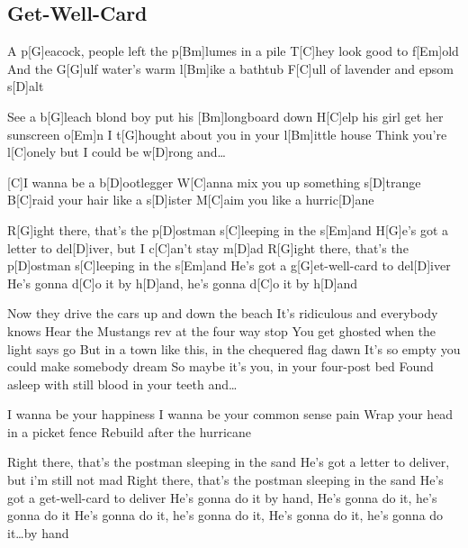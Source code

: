 \subsection*{Get-Well-Card   }
\begin{guitar}
A p[G]eacock, people left the p[Bm]lumes in a pile
T[C]hey look good to f[Em]old
And the G[G]ulf water's warm l[Bm]ike a bathtub
F[C]ull of lavender and epsom s[D]alt



See a b[G]leach blond boy put his [Bm]longboard down
H[C]elp his girl get her sunscreen o[Em]n
I t[G]hought about you in your l[Bm]ittle house
Think you're l[C]onely but I could be w[D]rong and\ldots



[C]I wanna be a b[D]ootlegger
W[C]anna mix you up something s[D]trange
B[C]raid your hair like a s[D]ister
M[C]aim you like a hurric[D]ane



R[G]ight there, that's the p[D]ostman s[C]leeping in the s[Em]and
H[G]e's got a letter to del[D]iver, but I c[C]an't stay m[D]ad
R[G]ight there, that's the p[D]ostman s[C]leeping in the s[Em]and
He's got a g[G]et-well-card to del[D]iver
He's gonna d[C]o it by h[D]and, he's gonna d[C]o it by h[D]and



Now they drive the cars up and down the beach
It's ridiculous and everybody knows
Hear the Mustangs rev at the four way stop
You get ghosted when the light says go
But in a town like this, in the chequered flag dawn
It's so empty you could make somebody dream
So maybe it's you, in your four-post bed
Found asleep with still blood in your teeth and\ldots



I wanna be your happiness
I wanna be your common sense pain
Wrap your head in a picket fence
Rebuild after the hurricane



Right there, that's the postman sleeping in the sand
He's got a letter to deliver, but i'm still not mad
Right there, that's the postman sleeping in the sand
He's got a get-well-card to deliver
He's gonna do it by hand,
He's gonna do it, he's gonna do it
He's gonna do it, he's gonna do it,
He's gonna do it, he's gonna do it\ldots by hand
\end{guitar}
